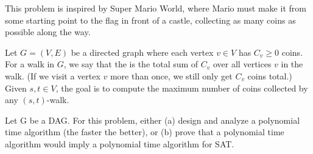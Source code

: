 \documentclass{article}
\begin{document}
\setcounter{section}{12}
\setcounter{exercise}{15}
 
This problem is inspired by Super Mario World, where Mario must make it from some starting point to the flag in front of a castle, collecting as many coins as possible along the way.

Let $G = (V,E)$ be a directed graph where each vertex $v \in V$ has $C_v \geq 0$ coins.
For a walk in $G$, we say that the  is the total sum of $C_v$ over all  vertices $v$ in the walk.
(If we visit a vertex $v$ more than once, we still only get $C_v$ coins total.)
Given $s, t \in V$, the goal is to compute the maximum number of coins collected by any $(s, t)$-walk.




\begin{subexercise} \label{mario-dag}
Let G be a DAG.
For this problem, either (a) design and analyze a polynomial time algorithm (the faster the better), or (b) prove that a polynomial time algorithm would imply a polynomial time algorithm for SAT.
\end{subexercise}
\end{document}
